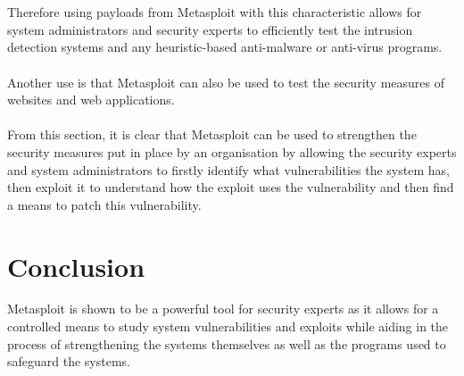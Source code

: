 \documentclass[a4paper, 12pt, titlepage]{report}
\begin{document}
\\\\
Therefore using payloads from Metasploit with this characteristic allows for system administrators and security experts to efficiently test the intrusion detection systems and any heuristic-based anti-malware or anti-virus programs.\cite{usesEvade}
\\\\
Another use is that Metasploit can also be used to test the security measures of websites and web applications.\cite{testweb} 
\\\\
From this section, it is clear that Metasploit can be used to strengthen the security measures put in place by an organisation by allowing the security experts and system administrators to firstly identify what vulnerabilities the system has, then exploit it to understand how the exploit uses the vulnerability and then find a means to patch this vulnerability.
\section{Conclusion}
Metasploit is shown to be a powerful tool for security experts as it allows for a controlled means to study system vulnerabilities and exploits while aiding in the process of strengthening the systems themselves as well as the programs used to safeguard the systems.
\end{document}
